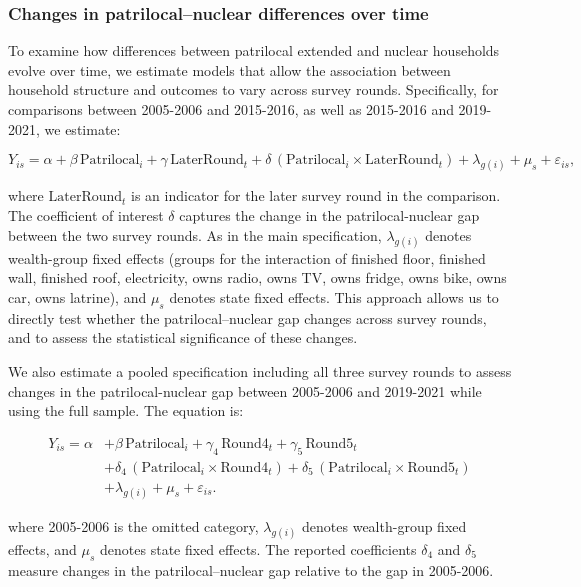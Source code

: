 \documentclass[12pt]{article}
\begin{document}
\subsubsection{Changes in patrilocal–nuclear differences over time}

To examine how differences between patrilocal extended and nuclear households evolve over time, we estimate models that allow the association between household structure and outcomes to vary across survey rounds. Specifically, for comparisons between 2005-2006 and 2015-2016, as well as 2015-2016 and 2019-2021, we estimate:

\begin{equation} \label{eq:controls}
Y_{is} = \alpha + \beta \,\text{Patrilocal}_i + \gamma \,\text{LaterRound}_t
+ \delta \,(\text{Patrilocal}_i \times \text{LaterRound}_t)
+ \lambda_{g(i)} + \mu_s + \varepsilon_{is},
\end{equation}


where $\text{LaterRound}_t$ is an indicator for the later survey round in the comparison. The coefficient of interest $\delta$ captures the change in the patrilocal-nuclear gap between the two survey rounds. As in the main specification, $\lambda_{g(i)}$ denotes wealth-group fixed effects (groups for the interaction of finished floor, finished wall, finished roof, electricity, owns radio, owns TV, owns fridge, owns bike, owns car, owns latrine), and $\mu_s$ denotes state fixed effects. This approach allows us to directly test whether the patrilocal–nuclear gap changes across survey rounds, and to assess the statistical significance of these changes.

We also estimate a pooled specification including all three survey rounds to assess changes in the patrilocal-nuclear gap between 2005-2006 and 2019-2021 while using the full sample. The equation is:

\begin{equation}
\begin{aligned}
Y_{is} = \alpha 
&+ \beta \,\text{Patrilocal}_i
+ \gamma_4 \,\text{Round4}_t
+ \gamma_5 \,\text{Round5}_t \\
&+ \delta_4 \,(\text{Patrilocal}_i \times \text{Round4}_t)
+ \delta_5 \,(\text{Patrilocal}_i \times \text{Round5}_t) \\
&+ \lambda_{g(i)} + \mu_s + \varepsilon_{is}.
\end{aligned}
\label{eq:controls_stacked}
\end{equation}

where 2005-2006 is the omitted category, $\lambda_{g(i)}$ denotes wealth-group fixed effects, and $\mu_s$ denotes state fixed effects. The reported coefficients $\delta_4$ and $\delta_5$ measure changes in the patrilocal--nuclear gap relative to the gap in 2005-2006.
\end{document}
